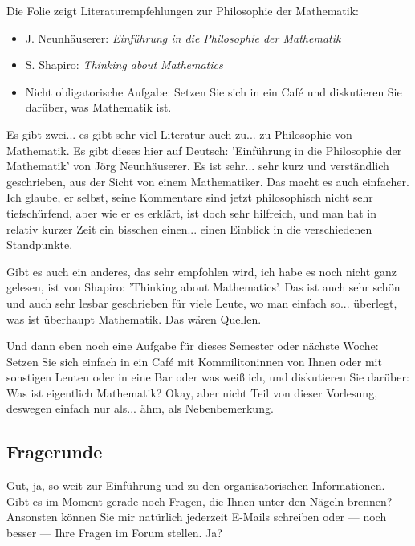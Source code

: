 \begin{meta-note}
Die Folie zeigt Literaturempfehlungen zur Philosophie der Mathematik:
\begin{itemize}
    \item J. Neunhäuserer: \emph{Einführung in die Philosophie der Mathematik}
    \item S. Shapiro: \emph{Thinking about Mathematics}
    \item Nicht obligatorische Aufgabe: Setzen Sie sich in ein Café und diskutieren Sie darüber, was Mathematik ist.
\end{itemize}
\end{meta-note}

\begin{spoken-clean}[00:20:38 - 00:22:05]
Es gibt zwei... es gibt sehr viel Literatur auch zu... zu Philosophie von Mathematik. Es gibt dieses hier auf Deutsch: 'Einführung in die Philosophie der Mathematik' von Jörg Neunhäuserer. Es ist sehr... sehr kurz und verständlich geschrieben, aus der Sicht von einem Mathematiker. Das macht es auch einfacher. Ich glaube, er selbst, seine Kommentare sind jetzt philosophisch nicht sehr tiefschürfend, aber wie er es erklärt, ist doch sehr hilfreich, und man hat in relativ kurzer Zeit ein bisschen einen... einen Einblick in die verschiedenen Standpunkte. 

Gibt es auch ein anderes, das sehr empfohlen wird, ich habe es noch nicht ganz gelesen, ist von Shapiro: 'Thinking about Mathematics'. Das ist auch sehr schön und auch sehr lesbar geschrieben für viele Leute, wo man einfach so... überlegt, was ist überhaupt Mathematik. Das wären Quellen. 

Und dann eben noch eine Aufgabe für dieses Semester oder nächste Woche: Setzen Sie sich einfach in ein Café mit Kommilitoninnen von Ihnen oder mit sonstigen Leuten oder in eine Bar oder was weiß ich, und diskutieren Sie darüber: Was ist eigentlich Mathematik? Okay, aber nicht Teil von dieser Vorlesung, deswegen einfach nur als... ähm, als Nebenbemerkung.
\end{spoken-clean}

\subsection{Fragerunde}

\begin{spoken-clean}[00:22:05 - 00:22:15]
Gut, ja, so weit zur Einführung und zu den organisatorischen Informationen. Gibt es im Moment gerade noch Fragen, die Ihnen unter den Nägeln brennen? Ansonsten können Sie mir natürlich jederzeit E-Mails schreiben oder --- noch besser --- Ihre Fragen im Forum stellen. Ja?
\end{spoken-clean}

